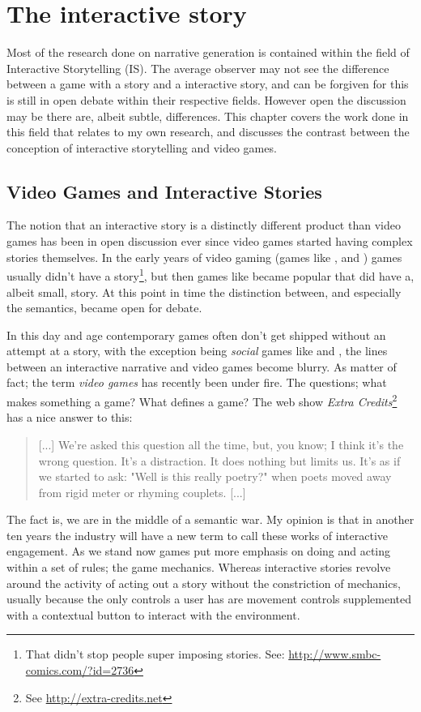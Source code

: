 \chapter{The interactive story}
\label{ch:is}
Most of the research done on narrative generation is contained within the field of Interactive Storytelling (IS). The average observer may not see the difference between a game with a story and a interactive story, and can be forgiven for this is still in open debate within their respective fields. However open the discussion may be there are, albeit subtle, differences. This chapter covers the work done in this field that relates to my own research, and discusses the contrast between the conception of interactive storytelling and video games.

\section{Video Games and Interactive Stories}
The notion that an interactive story is a distinctly different product than video games has been in open discussion ever since video games started having complex stories themselves. In the early years of video gaming (games like ,  and ) games usually didn't have a story\footnote{That didn't stop people super imposing stories. See: \url{http://www.smbc-comics.com/?id=2736}}, but then games like  became popular that did have a, albeit small, story. At this point in time the distinction between, and especially the semantics, became open for debate.

In this day and age contemporary games often don't get shipped without an attempt at a story, with the exception being \textit{social} games like  and , the lines between an interactive narrative and video games become blurry. As matter of fact; the term \textit{video games} has recently been under fire. The questions; what makes something a game? What defines a game? The web show \textit{Extra Credits}\footnote{See \url{http://extra-credits.net}} has a nice answer to this: 
\begin{quote}
[...] We're asked this question all the time, but, you know; I think it's the wrong question. It's a distraction. It does nothing but limits us. It's as if we started to ask: "Well is this really poetry?" when poets moved away from rigid meter or rhyming couplets. [...]
\end{quote}
The fact is, we are in the middle of a semantic war. My opinion is that in another ten years the industry will have a new term to call these works of interactive engagement. As we stand now games put more emphasis on doing and acting within a set of rules; the game mechanics. Whereas interactive stories revolve around the activity of acting out a story without the constriction of mechanics, usually because the only controls a user has are movement controls supplemented with a contextual button to interact with the environment.
 
